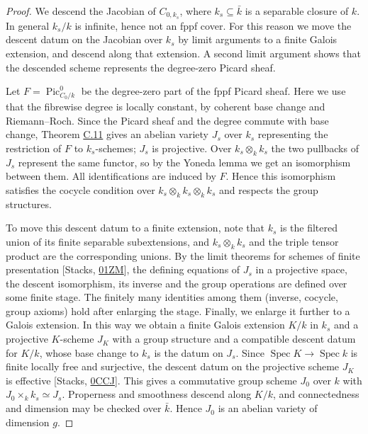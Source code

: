 \documentclass[11pt]{article}
\begin{document}
\begin{proof}[{Proof}]\label{bp168}%
We descend the Jacobian of \(C_{0,k_s}\), where \(k_s\subseteq\bar
k\) is a separable closure of \(k\). In general \(k_s/k\) is infinite, hence not an fppf cover. For this reason we move the descent datum on the Jacobian over \(k_s\) by limit arguments to a finite Galois extension, and descend along that extension. A second limit argument shows that the descended scheme represents the degree-zero Picard sheaf.

Let \(F=\operatorname{Pic}^0_{C_0/k}\) be the degree-zero part of the fppf Picard sheaf. Here we use that the fibrewise degree is locally constant, by coherent base change and Riemann–Roch. Since the Picard sheaf and the degree commute with base change, Theorem \hyperref[bp154]{C.11} gives an abelian variety \(J_s\) over \(k_s\) representing the restriction of \(F\) to \(k_s\)-schemes; \(J_s\) is projective. Over \(k_s\otimes_kk_s\) the two pullbacks of \(J_s\) represent the same functor, so by the Yoneda lemma we get an isomorphism between them. All identifications are induced by \(F\). Hence this isomorphism satisfies the cocycle condition over \(k_s\otimes_kk_s\otimes_kk_s\) and respects the group structures.

To move this descent datum to a finite extension, note that \(k_s\) is the filtered union of its finite separable subextensions, and \(k_s\otimes_kk_s\) and the triple tensor product are the corresponding unions. By the limit theorems for schemes of finite presentation [Stacks, \href{https://stacks.math.columbia.edu/tag/01ZM}{01ZM}], the defining equations of \(J_s\) in a projective space, the descent isomorphism, its inverse and the group operations are defined over some finite stage. The finitely many identities among them (inverse, cocycle, group axioms) hold after enlarging the stage. Finally, we enlarge it further to a Galois extension. In this way we obtain a finite Galois extension \(K/k\) in \(k_s\) and a projective \(K\)-scheme \(J_K\) with a group structure and a compatible descent datum for \(K/k\), whose base change to \(k_s\) is the datum on \(J_s\). Since \(\operatorname{Spec}K\to\operatorname{Spec}k\) is finite locally free and surjective, the descent datum on the projective scheme \(J_K\) is effective [Stacks, \href{https://stacks.math.columbia.edu/tag/0CCJ}{0CCJ}]. This gives a commutative group scheme \(J_0\) over \(k\) with \(J_0\times_kk_s\simeq J_s\). Properness and smoothness descend along \(K/k\), and connectedness and dimension may be checked over \(\bar
k\). Hence \(J_0\) is an abelian variety of dimension \(g\).


\end{proof}
\end{document}
